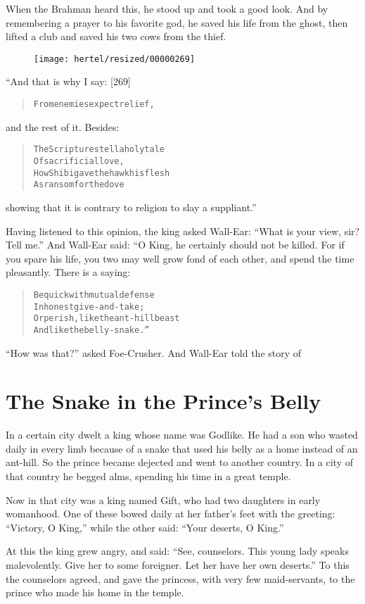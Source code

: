 \documentclass[article, twoside, 10pt]{memoir}
\renewenvironment{verbatim}{%
\begin{quote}%
\vskip -10pt%
\begin{alltt}\normalfont\small}{\end{alltt}%
\end{quote}%
\vskip -10pt
} %
\begin{document}
When the Brahman heard this, he stood up and took a good look. And
by remembering a prayer to his favorite god, he saved his life from
the ghost, then lifted a club and saved his two cows from the
thief.

\begin{figure}[p]\texttt{[image: hertel/resized/00000269]}\end{figure}“And that is why I say: [269]

\begin{verbatim}
From enemies expect relief,
\end{verbatim}
and the rest of it. Besides:

\begin{verbatim}
The Scriptures tell a holy tale
    Of sacrificial love,
How Shibi gave the hawk his flesh
    As ransom for the dove{\textemdash}
\end{verbatim}
showing that it is contrary to religion to slay a suppliant.”

Having listened to this opinion, the king asked Wall-Ear:
``What is your view, sir? Tell me.'' And Wall-Ear said: “O King, he
certainly should not be killed. For if you spare his life, you two
may well grow fond of each other, and spend the time pleasantly.
There is a saying:

\begin{verbatim}
Be quick with mutual defense
    In honest give-and-take;
Or perish, like the ant-hill beast
    And like the belly-snake.”
\end{verbatim}
``How was that?'' asked Foe-Crusher. And Wall-Ear told the story
of

\chapter{The Snake in the Prince's Belly}

In a certain city dwelt a king whose name was Godlike. He had a son
who wasted daily in every limb because of a snake that used his
belly as a home instead of an ant-hill. So the prince became
dejected and went to another country. In a city of that country he
begged alms, spending his time in a great temple.

Now in that city was a king named Gift, who had two daughters in
early womanhood. One of these bowed daily at her father's feet with
the greeting: ``Victory, O King,'' while the other said:
``Your deserts, O King.''

At this the king grew angry, and said:
``See, counselors. This young lady speaks malevolently. Give her to some foreigner. Let her have her own deserts.''
To this the counselors agreed, and gave the princess, with very few
maid-servants, to the prince who made his home in the temple.
\end{document}
